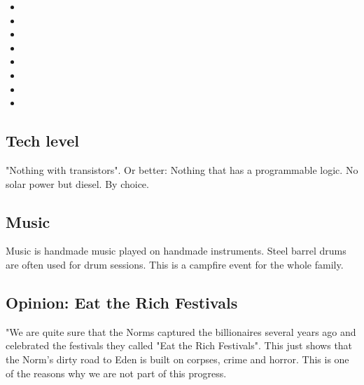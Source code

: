 \begin{losttalk}[title=Not Reading the Classics]
    \begin{itemize}
        \item {}
        \item {}
        \item {}
        \item {}
        \item {}
        \item {}
        \item {}
        \item {}
    \end{itemize}
\end{losttalk}

\subsection{Tech level}

"Nothing with transistors". Or better: Nothing that has a programmable logic. No solar power but diesel. By choice.

\subsection{Music}

Music is handmade music played on handmade instruments. Steel barrel drums are often used for drum sessions. This is a campfire event for the whole family.

\subsection{Opinion: Eat the Rich Festivals}

"We are quite sure that the Norms captured the billionaires several years ago and celebrated the festivals they called "Eat the Rich Festivals". This just shows that the Norm's dirty road to Eden is built on corpses, crime and horror. This is one of the reasons why we are not part of this progress.

